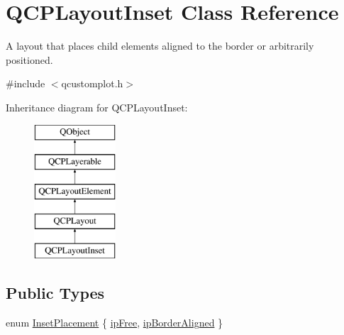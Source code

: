 \hypertarget{class_q_c_p_layout_inset}{}\section{Q\+C\+P\+Layout\+Inset Class Reference}
\label{class_q_c_p_layout_inset}


A layout that places child elements aligned to the border or arbitrarily positioned.  




{\ttfamily \#include $<$qcustomplot.\+h$>$}

Inheritance diagram for Q\+C\+P\+Layout\+Inset\+:\begin{figure}[H]
\begin{center}
\leavevmode
\includegraphics[height=5.000000cm]{db/d91/class_q_c_p_layout_inset}
\end{center}
\end{figure}
\subsection*{Public Types}
\begin{DoxyCompactItemize}
\item 
enum \mbox{\hyperlink{class_q_c_p_layout_inset_a8b9e17d9a2768293d2a7d72f5e298192}{Inset\+Placement}} \{ \mbox{\hyperlink{class_q_c_p_layout_inset_a8b9e17d9a2768293d2a7d72f5e298192aa4802986ea2cea457f932b115acba59e}{ip\+Free}}, 
\mbox{\hyperlink{class_q_c_p_layout_inset_a8b9e17d9a2768293d2a7d72f5e298192aa81e7df4a785ddee2229a8f47c46e817}{ip\+Border\+Aligned}}
 \}
\end{DoxyCompactItemize}
